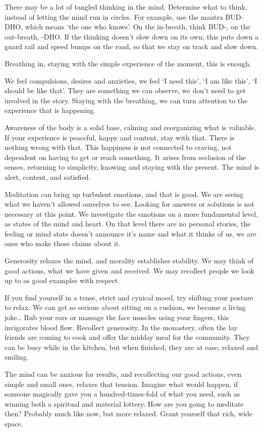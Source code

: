 There may be a lot of tangled thinking in the mind. Determine what to
think, instead of letting the mind run in circles. For example, use the
mantra BUD-DHO, which means `the one who knows'. On the in-breath, think
BUD-, on the out-breath, -DHO. If the thinking doesn't slow down on its
own, this puts down a guard rail and speed bumps on the road, so that we
stay on track and slow down.

Breathing in, staying with the simple experience of the moment, this is
enough.

We feel compulsions, desires and anxieties, we feel `I need this', `I am
like this', `I should be like that'. They are something we can observe,
we don't need to get involved in the story. Staying with the breathing,
we can turn attention to the experience that is happening.

Awareness of the body is a solid base, calming and reorganizing what is
valuable. If your experience is peaceful, happy and content, stay with
that. There is nothing wrong with that. This happiness is not connected
to craving, not dependent on having to get or reach something. It arises
from seclusion of the senses, returning to simplicity, knowing and
staying with the present. The mind is alert, content, and satisfied.

Meditation can bring up turbulent emotions, and that is good. We are
seeing what we haven't allowed ourselves to see. Looking for answers or
solutions is not necessary at this point. We investigate the emotions on
a more fundamental level, as states of the mind and heart. On that level
there are no personal stories, the feeling or mind state doesn't
announce it's name and what it thinks of us, we are ones who make those
claims about it.

Generosity relaxes the mind, and morality establishes stability. We may
think of good actions, what we have given and received. We may recollect
people we look up to as good examples with respect.

If you find yourself in a tense, strict and cynical mood, try shifting
your posture to relax. We can get so serious about sitting on a cushion,
we become a living joke\ldots{} Rub your ears or massage the face
muscles using your fingers, this invigorates blood flow. Recollect
generosity. In the monastery, often the lay friends are coming to cook
and offer the midday meal for the community. They can be busy while in
the kitchen, but when finished, they are at ease, relaxed and smiling.

The mind can be anxious for results, and recollecting our good actions,
even simple and small ones, relaxes that tension. Imagine what would
happen, if someone magically gave you a hundred-times-fold of what you
need, such as winning both a spiritual and material lottery. How are you
going to meditate then? Probably much like now, but more relaxed. Grant
yourself that rich, wide space.

